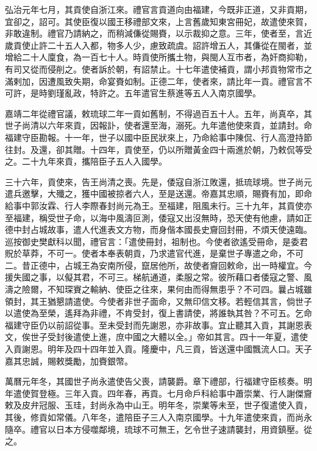 \begin{pinyinscope}
弘治元年七月，其貢使自浙江來。禮官言貢道向由福建，今既非正道，又非貢期，宜卻之，詔可。其使臣復以國王移禮部文來，上言舊歲知東宮冊妃，故遣使來賀，非敢違制。禮官乃請納之，而稍減傔從賜賚，以示裁抑之意。三年，使者至，言近歲貢使止許二十五人入都，物多人少，慮致疏虞。詔許增五人，其傔從在閩者，並增給二十人廩食，為一百七十人。時貢使所攜土物，與閩人互市者，為奸商抑勒，有司又從而侵削之。使者訴於朝，有詔禁止。十七年遣使補貢，謂小邦貢物常市之滿剌加，因遭風致失期，命宴賚如制。正德二年，使者來，請比年一貢。禮官言不可許，是時劉瑾亂政，特許之。五年遣官生蔡進等五人入南京國學。

嘉靖二年從禮官議，敕琉球二年一貢如舊制，不得過百五十人。五年，尚真卒，其世子尚清以六年來貢，因報訃，使者還至海，溺死。九年遣他使來貢，並請封。命福建守臣勘報。十一年，世子以國中臣民狀來上，乃命給事中陳侃、行人高澄持節往封。及還，卻其贈。十四年，貢使至，仍以所贈黃金四十兩進於朝，乃敕侃等受之。二十九年來貢，攜陪臣子五人入國學。

三十六年，貢使來，告王尚清之喪。先是，倭寇自浙江敗還，抵琉球境。世子尚元遣兵邀擊，大殲之，獲中國被掠者六人，至是送還。帝嘉其忠順，賜賚有加，即命給事中郭汝霖、行人李際春封尚元為王。至福建，阻風未行。三十九年，其貢使亦至福建，稱受世子命，以海中風濤叵測，倭寇又出沒無時，恐天使有他慮，請如正德中封占城故事，遣人代進表文方物，而身偕本國長史齎回封冊，不煩天使遠臨。巡按御史樊獻科以聞，禮官言：「遣使冊封，祖制也。今使者欲遙受冊命，是委君貺於草莽，不可一。使者本奉表朝貢，乃求遣官代進，是棄世子專遣之命，不可二。昔正德中，占城王為安南所侵，竄居他所，故使者齎回敕命，出一時權宜。今援失國之事，以儗其君，不可三。梯航通道，柔服之常。彼所藉口者倭寇之警、風濤之險爾，不知琛賨之輸納、使臣之往來，果何由而得無患乎？不可四。曩占城雖領封，其王猶懇請遣使。今使者非世子面命，又無印信文移。若輕信其言，倘世子以遣使為至榮，遙拜為非禮，不肯受封，復上書請使，將誰執其咎？不可五。乞命福建守臣仍以前詔從事。至未受封而先謝恩，亦非故事。宜止聽其入貢，其謝恩表文，俟世子受封後遣使上進，庶中國之大體以全。」帝如其言。四十一年夏，遣使入貢謝恩。明年及四十四年並入貢。隆慶中，凡三貢，皆送還中國飄流人口。天子嘉其忠誠，賜敕獎勵，加賚銀幣。

萬曆元年冬，其國世子尚永遣使告父喪，請襲爵。章下禮部，行福建守臣核奏。明年遣使賀登極。三年入貢。四年春，再貢。七月命戶科給事中蕭崇業、行人謝傑齎敕及皮弁冠服、玉珪，封尚永為中山王。明年冬，崇業等未至，世子復遣使入貢，其後，修貢如常儀。八年冬，遣陪臣子三人入南京國學。十九年遣使來貢，而尚永隨卒。禮官以日本方侵噬鄰境，琉球不可無王，乞令世子速請襲封，用資鎮壓。從之。


\end{pinyinscope}
